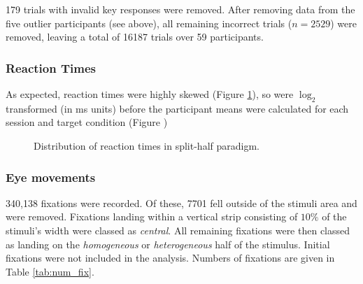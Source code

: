 \documentclass[a4paper, oneside, 11pt, onecolumn]{article}
\begin{document}
179 trials with invalid key responses were removed. After removing data from the five outlier participants (see above), all remaining incorrect trials ($n=2529$) were removed, leaving a total of 16187 trials over 59 participants.

\subsubsection{Reaction Times}
As expected, reaction times were highly skewed (Figure \ref{fig:splithalf_rt_dists_all}), so were $\log_2$ transformed (in ms units) before the participant means were calculated for each session and target condition (Figure )

\begin{figure}
\centering
{}
\caption{Distribution of reaction times in split-half paradigm.}
\label{fig:splithalf_rt_dists_all}
\end{figure}

\subsubsection{Eye movements}

340,138 fixations were recorded. Of these, 7701 fell outside of the stimuli area and were removed. Fixations landing within a vertical strip consisting of $10\%$ of the stimuli's width were classed as \textit{central}. All remaining fixations were then classed as landing on the \textit{homogeneous} or \textit{heterogeneous} half of the stimulus. Initial fixations were not included in the analysis. Numbers of fixations are given in Table \ref{tab:num_fix}.
\end{document}
